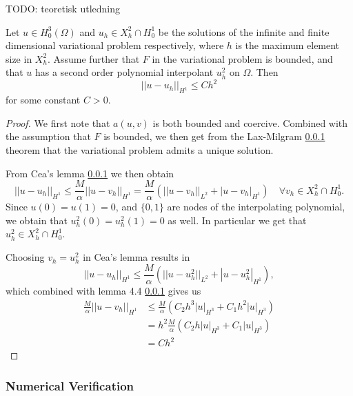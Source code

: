 TODO: teoretisk utledning

\begin{theorem}
    Let $u \in H_0^3(\Omega)$ and $u_h \in X_h^2 \cap H_0^1$ be the solutions of the infinite and finite dimensional
    variational problem respectively, where $h$ is the maximum element size in $X_h^2$. Assume further that $F$ in the variational problem is bounded,
    and that $u$ has a second order polynomial interpolant $u_h^2$ on $\Omega$. Then
    \begin{equation}
        ||u - u_h||_{H^1} \leq Ch^2
    \end{equation}
    for some constant $C > 0$.
\end{theorem}
\begin{proof}
    We first note that $a(u, v)$ is both bounded and coercive. Combined with the assumption that $F$ is bounded, we then get from the Lax-Milgram \ref{}
    theorem that the variational problem admits a unique solution.
    
    From Cea's lemma \ref{} we then obtain
    \begin{equation}
        ||u - u_h||_{H^1} \leq \frac{M}{\alpha}||u - v_h||_{H^1} = \frac{M}{\alpha}(||u - v_h||_{L^2} + |u - v_h|_{H^1}) \quad \forall v_h \in X_h^2 \cap H_0^1.
    \end{equation}
    Since $u(0) = u(1) = 0$, and $\{0, 1\}$ are nodes of the interpolating polynomial, we obtain that $u_h^2(0) = u_h^2(1) = 0$ as well.
    In particular we get that $u_h^2 \in X_h^2 \cap H_0^1$.
    
    Choosing $v_h = u_h^2$ in Cea's lemma results in 
    \begin{equation}
        ||u - u_h||_{H^1} \leq \frac{M}{\alpha}(||u - u_h^2||_{L^2} + |u - u_h^2|_{H^1}),
    \end{equation}
    which combined with lemma 4.4 \ref{} gives us
    \begin{equation}
        \begin{aligned}
            \frac{M}{\alpha}||u - v_h||_{H^1} &\leq \frac{M}{\alpha}(C_{2}h^3|u|_{H^3} + C_{1}h^2|u|_{H^3}) \\
            &= h^2\frac{M}{\alpha}(C_{2}h|u|_{H^3} + C_{1}|u|_{H^3}) \\
            &= Ch^2
        \end{aligned}
    \end{equation}
\end{proof}


\subsubsection{Numerical Verification}

